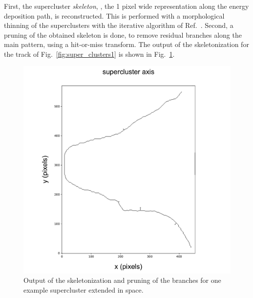 First, the supercluster \textit{skeleton}, \ie, the 1 pixel wide
representation along the energy deposition path, is reconstructed.
This is performed with a morphological thinning of the superclusters
with the iterative algorithm of Ref.~\cite{thin1,thin2}.  Second, a
pruning of the obtained skeleton is done, to remove residual branches
along the main pattern, using a hit-or-miss transform.  The output of
the skeletonization for the track of Fig.~\ref{fig:super_clusters1} is
shown in Fig.~\ref{fig:skeleton}.
%
\begin{figure}[ht]
  \begin{center}
     \includegraphics[width=0.49\linewidth]{figures/skeleton_paper}
     \caption{Output of the skeletonization and pruning of the
       branches for one example supercluster extended in
       space.  \label{fig:skeleton}}
  \end{center}
\end{figure}
%


